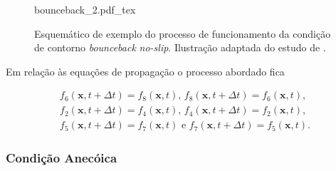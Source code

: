   

\begin{figure}[ht!]
  \centering
  \def\svgwidth{200pt}
  {bounceback_2.pdf_tex}
  \caption[Funcionamento do \textit{bounceback} \textit{no-slip}]{Esquemático de exemplo do processo de funcionamento da condição de contorno \textit{bounceback} \textit{no-slip}. Ilustração adaptada do estudo de .}
  \label{fig:bounceback}
\end{figure}

\newpage
Em relação às equações de propagação o processo abordado fica

\begin{gather*}
  f_{6}(\textbf{x}, t + \Delta t) = f_{8}(\textbf{x}, t)\text{,  } f_{8}(\textbf{x}, t + \Delta t) = f_{6}(\textbf{x}, t), \\
  f_{2}(\textbf{x}, t + \Delta t) = f_{4}(\textbf{x}, t)\text{,  } f_{4}(\textbf{x}, t + \Delta t) = f_{2}(\textbf{x}, t) \text{, }\\
  f_{5}(\textbf{x}, t + \Delta t) = f_{7}(\textbf{x}, t)\text{ e } f_{7}(\textbf{x}, t + \Delta t) = f_{5}(\textbf{x}, t).
\label{eq:bounceback}
\end{gather*}

\subsubsection{Condição Anecóica}

